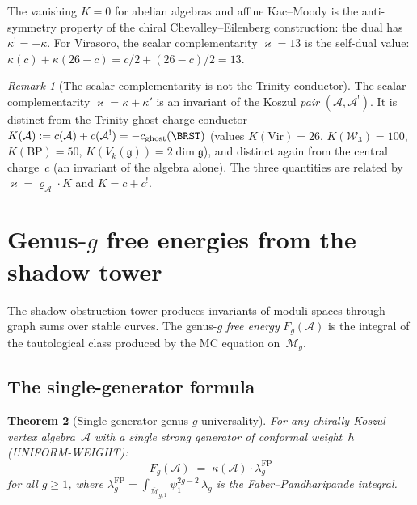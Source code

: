 \documentclass[11pt,reqno]{amsart}
\newtheorem{theorem}{Theorem}[section]
\theoremstyle{definition}
\theoremstyle{remark}
\newtheorem{remark}[theorem]{Remark}
\newcommand{\cA}{\mathcal{A}}
\newcommand{\cW}{\mathcal{W}}
\newcommand{\Mbar}{\overline{\mathcal{M}}}
\newcommand{\fg}{\mathfrak{g}}
\newcommand{\Vir}{\mathrm{Vir}}
\numberwithin{equation}{section}
\begin{document}
\noindent The vanishing $K = 0$ for abelian algebras and
affine Kac--Moody is the anti-symmetry property of the
chiral Chevalley--Eilenberg construction: the dual has
$\kappa^! = -\kappa$. For Virasoro, the scalar complementarity
$\varkappa = 13$ is the self-dual value: $\kappa(c) + \kappa(26-c)
= c/2 + (26-c)/2 = 13$.

\begin{remark}[The scalar complementarity is not the Trinity
conductor]\label{rem:conductor-not-c}
The scalar complementarity $\varkappa = \kappa + \kappa'$ is an
invariant of the Koszul \emph{pair} $(\cA, \cA^!)$. It is
distinct from the Trinity ghost-charge conductor
$K(\cA) := c(\cA) + c(\cA^!) = -c_{\mathrm{ghost}}(\BRST)$
(values $K(\Vir) = 26$, $K(\cW_3) = 100$, $K(\mathrm{BP}) = 50$,
$K(V_k(\fg)) = 2\dim\fg$), and distinct again from the central
charge~$c$ (an invariant of the algebra alone). The three
quantities are related by $\varkappa = \varrho_{\cA}\cdot K$ and
$K = c + c^!$.
\end{remark}



\section{Genus-$g$ free energies from the shadow
tower}\label{sec:genus-g}

The shadow obstruction tower produces invariants of moduli
spaces through graph sums over stable curves. The genus-$g$
\emph{free energy} $F_g(\cA)$ is the integral of the
tautological class produced by the MC equation on~$\Mbar_g$.

\subsection{The single-generator
formula}\label{subsec:single-gen}

\begin{theorem}[Single-generator genus-$g$
universality]\label{thm:single-gen-universality}
For any chirally Koszul vertex algebra~$\cA$ with a single
strong generator of conformal weight~$h$
\textup{(}UNIFORM-WEIGHT\textup{)}:
\begin{equation}\label{eq:single-gen-Fg}
 F_g(\cA) \;=\; \kappa(\cA) \cdot
 \lambda_g^{\mathrm{FP}}
\end{equation}
for all $g \ge 1$, where
$\lambda_g^{\mathrm{FP}} =
\int_{\Mbar_{g,1}} \psi_1^{2g-2}\, \lambda_g$
is the Faber--Pandharipande integral.
\end{theorem}
\end{document}
